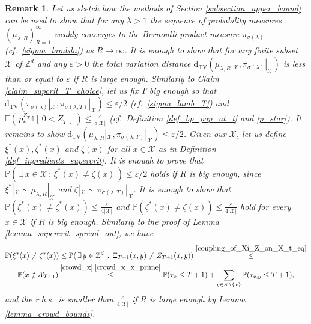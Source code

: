 \documentclass[a4paper,12pt]{article}
\newtheorem  {remark}        [theorem]{Remark}
\begin{document}
\begin{remark} \label{rem_sketch_measure} Let us  sketch how the methods of Section \ref{subsection_upper_bound} can be used to show that for any $\lambda >1$ the sequence of probability measures $(\mu_{\lambda,R})_{R=1}^{\infty}$ weakly converges   to the Bernoulli product measure $\pi_{\sigma(\lambda)}$ (cf.\ \eqref{sigma_lambda})  as $R \to \infty$.
It is enough to show that for any  finite subset $\mathcal{X}$ of $\mathbb{Z}^d$ and any $\varepsilon>0$ the total variation distance
$\mathrm{d}_{\mathrm{TV}}(  \mu_{\lambda,R} |_{\mathcal{X}},   \pi_{\sigma(\lambda)}|_{\mathcal{X}})$ is less than or equal to $\varepsilon$ if $R$ is large enough.
Similarly to Claim \ref{claim_supcrit_T_choice}, let us fix $T$ big enough so that $\mathrm{d}_{\mathrm{TV}}(  \pi_{\sigma(\lambda)}|_{\mathcal{X}} ,   \pi_{\sigma(\lambda,T)}|_{\mathcal{X}})\leq \varepsilon/2 $ (cf.\ \eqref{sigma_lamb_T}) and $ \mathbb{E}\left( \, p_*^{Z_T} \mathds{1}[ \, 0 < Z_T \, ] \, \right) \leq \frac{\varepsilon}{8|\mathcal{X}| }$ (cf.\ Definition \ref{def_bp_pop_at_t} and \eqref{p_star}). It remains to show $\mathrm{d}_{\mathrm{TV}}(  \mu_{\lambda,R} |_{\mathcal{X}},   \pi_{\sigma(\lambda,T)}|_{\mathcal{X}}) \leq \varepsilon/2$. Given our $\mathcal{X}$, let us define $\xi^*(x), \zeta^*(x)$ and $\zeta(x)$ for all $x \in \mathcal{X}$ as in Definition \ref{def_ingredients_supercrit}.
 It is enough to prove that $\mathbb{P}(\, \exists \, x \in \mathcal{X} \, : \, \xi^*(x) \neq  \zeta(x) \,)\leq \varepsilon/2 $ holds if $R$ is big enough, since
 $ \xi^*|_{\mathcal{X}} \sim  \mu_{\lambda,R} |_{\mathcal{X}}$ and
$\zeta|_{\mathcal{X}} \sim \pi_{\sigma(\lambda,T)}|_{\mathcal{X}}$. It is enough to show that
$\mathbb{P}( \xi^*(x) \neq  \zeta^*(x) )\leq \frac{\varepsilon}{4 |\mathcal{X}|} $ and $\mathbb{P}( \zeta^*(x) \neq  \zeta(x) )\leq \frac{\varepsilon}{4 |\mathcal{X}|} $ hold  for every $x \in \mathcal{X}$ if $R$ is big enough. Similarly to the proof of  Lemma \ref{lemma_supercrit_spread_out}, we have
\begin{multline*}
  \mathbb{P}( \xi^*(x) \neq  \zeta^*(x) ) \leq \mathbb{P}( \, \exists \, y \in \mathbb{Z}^d \, : \, \Xi_{T+1}(x,y) \neq Z_{T+1}(x,y) ) \stackrel{ \eqref{coupling_of_Xi_Z_on_X_t_eq} }{\leq} \\
   \mathbb{P}(x \notin \mathcal{X}_{T+1})
\stackrel{ \eqref{crowd_x}, \eqref{crowd_x_x_prime} }{\leq}      \mathbb{P}( \tau_x \leq T+1 ) + \sum_{y \in \mathcal{X} \setminus \{x \} }
   \mathbb{P}( \tau_{x,y} \leq T+1 ),
\end{multline*}
and the r.h.s.\ is smaller than $\frac{\varepsilon}{4 |\mathcal{X}|}$ if $R$ is large enough by Lemma \ref{lemma_crowd_bounds}.


\end{remark}
\end{document}
